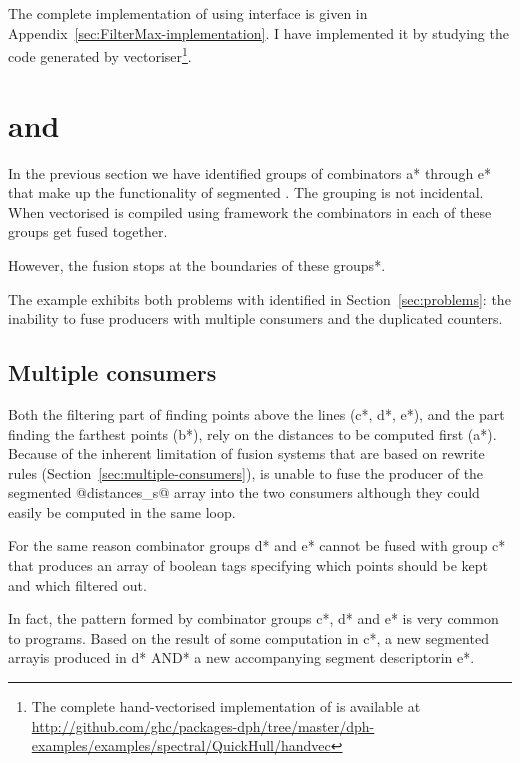 \documentclass[preamble.tex]{subfiles}
\begin{document}
The complete implementation of \FilterMax using \LiveFusion interface is given in Appendix~\ref{sec:FilterMax-implementation}. I have implemented it by studying the  code generated by \DPH vectoriser\footnote{The complete hand-vectorised implementation of \QuickHull is available at \url{http://github.com/ghc/packages-dph/tree/master/dph-examples/examples/spectral/QuickHull/handvec}}.



\section{\StreamFusion and \FilterMax}

In the previous section we have identified groups of combinators \*a* through \*e* that make up the functionality of segmented \FilterMax. The grouping is not incidental. When vectorised \QuickHull is compiled using \StreamFusion framework the combinators in each of these groups get fused together.

However, \*the fusion stops at the boundaries of these groups*.

The \FilterMax example exhibits both problems with \StreamFusion identified in Section~\ref{sec:problems}: the inability to fuse producers with multiple consumers and the duplicated counters.


\subsection{Multiple consumers}

Both the filtering part of \FilterMax finding points above the lines (\*c*, \*d*, \*e*), and the part finding the farthest points (\*b*), rely on the distances to be computed first (\*a*). Because of the inherent limitation of fusion systems that are based on rewrite rules (Section~\ref{sec:multiple-consumers}), \StreamFusion is unable to fuse the producer of the segmented @distances_s@ array into the two consumers although they could easily be computed in the same loop.

For the same reason combinator groups \*d* and \*e* cannot be fused with group \*c* that produces an array of boolean tags specifying which points should be kept and which filtered out.

\begin{bluebox}
In fact, the pattern formed by combinator groups \*c*, \*d* and \*e* is very common to \DPH programs. Based on the result of some computation in \*c*, a new segmented array\isegarray is produced in \*d* \*AND* a new accompanying segment descriptor\isegd in \*e*.
\end{bluebox}
\end{document}
